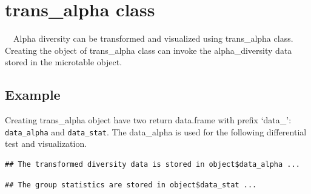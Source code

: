 \documentclass[
]{book}
\newenvironment{Shaded}{\begin{snugshade}}{\end{snugshade}}
\newcommand{\AttributeTok}[1]{\textcolor[rgb]{0.77,0.63,0.00}{#1}}
\newcommand{\CommentTok}[1]{\textcolor[rgb]{0.56,0.35,0.01}{\textit{#1}}}
\newcommand{\FunctionTok}[1]{\textcolor[rgb]{0.00,0.00,0.00}{#1}}
\newcommand{\NormalTok}[1]{#1}
\newcommand{\OtherTok}[1]{\textcolor[rgb]{0.56,0.35,0.01}{#1}}
\newcommand{\SpecialCharTok}[1]{\textcolor[rgb]{0.00,0.00,0.00}{#1}}
\newcommand{\StringTok}[1]{\textcolor[rgb]{0.31,0.60,0.02}{#1}}
\begin{document}
\hypertarget{trans_alpha-class}{%
\section{trans\_alpha class}\label{trans_alpha-class}}

　Alpha diversity can be transformed and visualized using trans\_alpha class.
Creating the object of trans\_alpha class can invoke the alpha\_diversity data stored in the microtable object.

\hypertarget{example-2}{%
\subsection{Example}\label{example-2}}

Creating trans\_alpha object have two return data.frame with prefix `data\_': \texttt{data\_alpha} and \texttt{data\_stat}.
The data\_alpha is used for the following differential test and visualization.

\begin{Shaded}
\end{Shaded}

\begin{verbatim}
## The transformed diversity data is stored in object$data_alpha ...
\end{verbatim}

\begin{verbatim}
## The group statistics are stored in object$data_stat ...
\end{verbatim}
\end{document}
